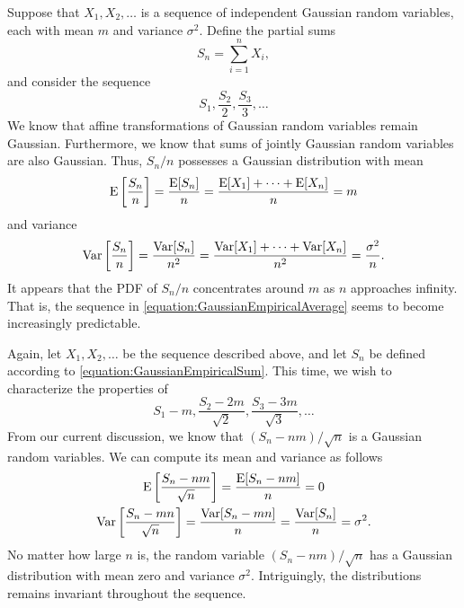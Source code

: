 \begin{example} \label{example:GaussianLLN}
Suppose that $X_1, X_2, \ldots$ is a sequence of independent Gaussian random variables, each with mean $m$ and variance $\sigma^2$.
Define the partial sums
\begin{equation} \label{equation:GaussianEmpiricalSum}
S_n = \sum_{i=1}^n X_i ,
\end{equation}
and consider the sequence
\begin{equation} \label{equation:GaussianEmpiricalAverage}
S_1, \frac{S_2}{2}, \frac{S_3}{3}, \ldots
\end{equation}
We know that affine transformations of Gaussian random variables remain Gaussian.
Furthermore, we know that sums of jointly Gaussian random variables are also Gaussian.
Thus, $S_n / n$ possesses a Gaussian distribution with mean
\begin{equation*}
\mathrm{E} \left[ \frac{S_n}{n} \right]
= \frac{ \mathrm{E} [ S_n ] }{n}
= \frac{ \mathrm{E} [ X_1 ] + \cdots + \mathrm{E} [ X_n ] }{n}
= m
\end{equation*}
and variance
\begin{equation*}
\mathrm{Var} \left[ \frac{S_n}{n} \right]
= \frac{ \mathrm{Var} [ S_n ] }{n^2}
= \frac{ \mathrm{Var} [ X_1 ] + \cdots + \mathrm{Var} [ X_n ] }{n^2}
= \frac{ \sigma^2 }{n} .
\end{equation*}
It appears that the PDF of $S_n / n$ concentrates around $m$ as $n$ approaches infinity.
That is, the sequence in \eqref{equation:GaussianEmpiricalAverage} seems to become increasingly predictable.
\end{example}

\begin{example} \label{example:GaussianCLT}
Again, let $X_1, X_2, \ldots$ be the sequence described above, and let $S_n$ be defined according to \eqref{equation:GaussianEmpiricalSum}.
This time, we wish to characterize the properties of
\begin{equation*}
S_1 - m, \frac{S_2 - 2m}{\sqrt{2}}, \frac{S_3 - 3m}{\sqrt{3}}, \ldots
\end{equation*}
From our current discussion, we know that $(S_n -nm) / \sqrt{n}$ is a Gaussian random variables.
We can compute its mean and variance as follows
\begin{gather*}
\mathrm{E} \left[ \frac{S_n -nm}{\sqrt{n}} \right]
= \frac{ \mathrm{E} [ S_n - nm] }{n}
= 0 \\
\mathrm{Var} \left[ \frac{S_n - mn}{\sqrt{n}} \right]
= \frac{ \mathrm{Var} [ S_n - mn] }{n}
= \frac{ \mathrm{Var} [ S_n ] }{n}
= \sigma^2 .
\end{gather*}
No matter how large $n$ is, the random variable $(S_n - nm)/\sqrt{n}$ has a Gaussian distribution with mean zero and variance $\sigma^2$.
Intriguingly, the distributions remains invariant throughout the sequence.
\end{example}


